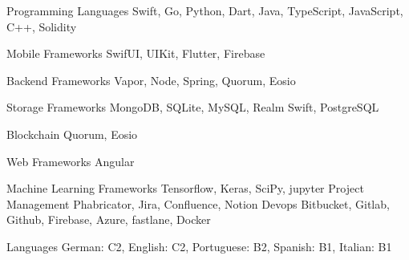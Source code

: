 \newpage
{}


\begin{cvskills}

\cvskill
{Programming Languages} %
{Swift, Go, Python, Dart, Java, TypeScript, JavaScript, C++, Solidity} %
\vspace{0.4cm}

\cvskill
{Mobile Frameworks} %
{SwifUI, UIKit, Flutter, Firebase} %
\vspace{0.4cm}

\cvskill
{Backend Frameworks} %
{Vapor, Node, Spring, Quorum, Eosio} %
\vspace{0.4cm}

\cvskill
{Storage Frameworks} %
{MongoDB, SQLite, MySQL, Realm Swift, PostgreSQL} %
\vspace{0.4cm}

\cvskill
{Blockchain} %
{Quorum, Eosio} %
\vspace{0.4cm}

\cvskill
{Web Frameworks} %
{Angular} %
\vspace{0.4cm}

\cvskill
{Machine Learning Frameworks} %
{Tensorflow, Keras, SciPy, jupyter} %
\vspace{0.4cm}
\cvskill
{Project Management} %
{Phabricator, Jira, Confluence, Notion} %
\vspace{0.4cm}
\cvskill
{Devops} %
{Bitbucket, Gitlab, Github, Firebase, Azure, fastlane, Docker} %
\vspace{0.4cm}


\cvskill
{Languages} %
{German: C2, English: C2, Portuguese: B2, Spanish: B1, Italian: B1} %


\end{cvskills}